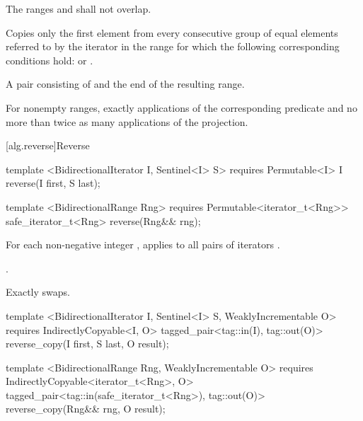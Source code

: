 \begin{itemdescr}
\pnum
\requires
The ranges
and
shall not overlap.

\pnum
\effects
Copies only the first element from every consecutive group of equal elements referred to by
the iterator
in the range
for which the following corresponding conditions hold:
or
.

\pnum
\returns
A pair consisting of  and the end of the resulting range.

\pnum
\complexity
For nonempty ranges, exactly
applications of the corresponding predicate and no more than twice as many
applications of the projection.
\end{itemdescr}

[alg.reverse]{Reverse}

%
\begin{itemdecl}
template <BidirectionalIterator I, Sentinel<I> S>
  requires Permutable<I>
  I reverse(I first, S last);

template <BidirectionalRange Rng>
  requires Permutable<iterator_t<Rng>>
  safe_iterator_t<Rng>
    reverse(Rng&& rng);
\end{itemdecl}

\begin{itemdescr}
\pnum
\effects
For each non-negative integer
,
applies
to all pairs of iterators
.

\pnum
\returns {}.

\pnum
\complexity
Exactly
swaps.
\end{itemdescr}

%
\begin{itemdecl}
template <BidirectionalIterator I, Sentinel<I> S, WeaklyIncrementable O>
  requires IndirectlyCopyable<I, O>
  tagged_pair<tag::in(I), tag::out(O)> reverse_copy(I first, S last, O result);

template <BidirectionalRange Rng, WeaklyIncrementable O>
  requires IndirectlyCopyable<iterator_t<Rng>, O>
  tagged_pair<tag::in(safe_iterator_t<Rng>), tag::out(O)>
    reverse_copy(Rng&& rng, O result);
\end{itemdecl}

